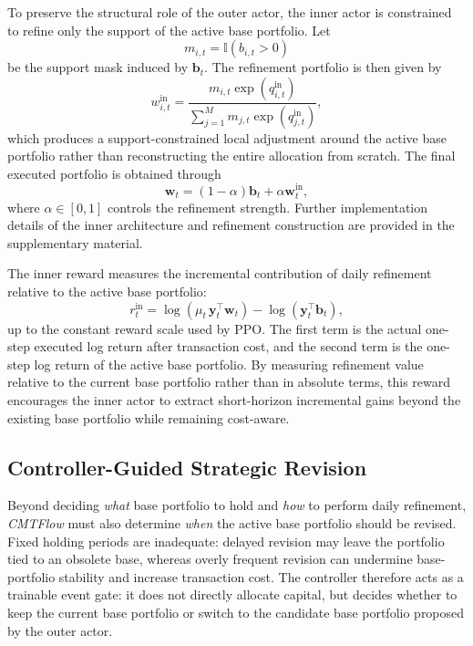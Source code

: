 \documentclass[letterpaper]{article} %
\begin{document}
To preserve the structural role of the outer actor, the inner actor is constrained to refine only the support of the active base portfolio. Let
\[
m_{i,t}
=
\mathbb{I}\!\left(b_{i,t}>0\right)
\]
be the support mask induced by \(\mathbf{b}_t\). The refinement portfolio is then given by
\[
w_{i,t}^{\mathrm{in}}
=
\frac{
m_{i,t}\exp(q_{i,t}^{\mathrm{in}})
}{
\sum_{j=1}^{M} m_{j,t}\exp(q_{j,t}^{\mathrm{in}})
},
\]
which produces a support-constrained local adjustment around the active base portfolio rather than reconstructing the entire allocation from scratch. The final executed portfolio is obtained through
\[
\mathbf{w}_t
=
(1-\alpha)\mathbf{b}_t
+
\alpha\mathbf{w}_t^{\mathrm{in}},
\]
where \(\alpha\in[0,1]\) controls the refinement strength. Further implementation details of the inner architecture and refinement construction are provided in the supplementary material.

The inner reward measures the incremental contribution of daily refinement relative to the active base portfolio:
\[
r_t^{\mathrm{in}}
=
\log\!\left(\mu_t\,\mathbf{y}_t^\top \mathbf{w}_t\right)
-
\log\!\left(\mathbf{y}_t^\top \mathbf{b}_t\right),
\]
up to the constant reward scale used by PPO. The first term is the actual one-step executed log return after transaction cost, and the second term is the one-step log return of the active base portfolio. By measuring refinement value relative to the current base portfolio rather than in absolute terms, this reward encourages the inner actor to extract short-horizon incremental gains beyond the existing base portfolio while remaining cost-aware.


\subsection{Controller-Guided Strategic Revision}

Beyond deciding \emph{what} base portfolio to hold and \emph{how} to perform daily refinement, \textit{CMTFlow} must also determine \emph{when} the active base portfolio should be revised. Fixed holding periods are inadequate: delayed revision may leave the portfolio tied to an obsolete base, whereas overly frequent revision can undermine base-portfolio stability and increase transaction cost. The controller therefore acts as a trainable event gate: it does not directly allocate capital, but decides whether to keep the current base portfolio or switch to the candidate base portfolio proposed by the outer actor.
\end{document}
